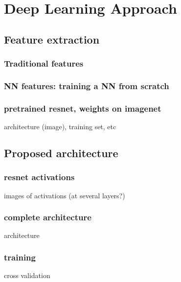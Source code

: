 
\chapter{Deep Learning Approach}

\label{Chapter4}

\section{Feature extraction}

\subsection{Traditional features}

\subsection{NN features: training a NN from scratch}

\subsection{pretrained resnet, weights on imagenet}

architecture (image), training set, etc

\section{Proposed architecture}

\subsection{resnet activations}

images of activations (at several layers?)

\subsection{complete architecture}

architecture

\subsection{training}

cross validation
